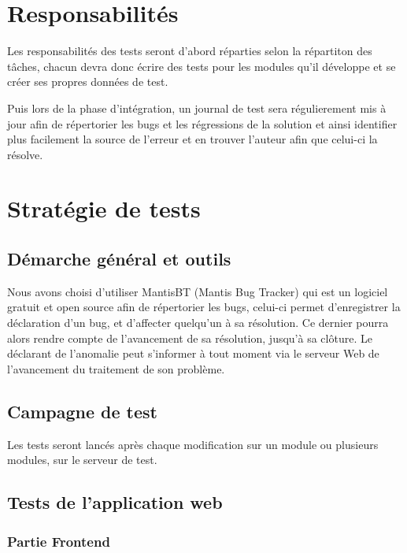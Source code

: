\chapter{Responsabilités}
Les responsabilités des tests seront d'abord réparties selon la répartiton des tâches, chacun
devra donc écrire des tests pour les modules qu'il développe et se créer ses propres données
de test.

Puis lors de la phase d'intégration, un journal de test sera régulierement mis à jour
afin de répertorier les bugs et les régressions de la solution et ainsi identifier plus      
facilement la source de l'erreur et en trouver l'auteur afin que celui-ci la résolve.


\chapter{Stratégie de tests}

\section{Démarche général et outils}
\label{section:dem_gen}
Nous avons choisi d'utiliser MantisBT (Mantis Bug Tracker) qui est un logiciel gratuit
et open source afin de répertorier les bugs, celui-ci permet d'enregistrer la déclaration
 d'un bug, et d'affecter quelqu'un à sa résolution. Ce dernier pourra alors rendre compte de
l'avancement de sa résolution, jusqu'à sa clôture. Le déclarant de l'anomalie peut  
s'informer à tout moment via le serveur Web de l'avancement du traitement de 
son problème.  

\section{Campagne de test}
Les tests seront lancés après chaque modification sur un module ou plusieurs modules, sur
le serveur de test.

\section{Tests de l'application web}

\subsection{Partie Frontend}

